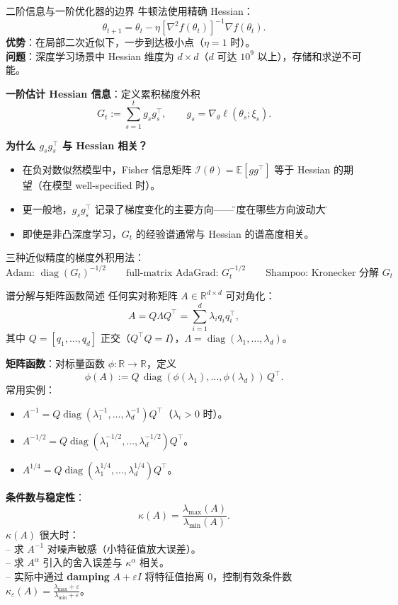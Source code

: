 \documentclass[aspectratio=169,10pt]{ctexbeamer}
\newcommand{\R}{\mathbb{R}}
\newcommand{\E}{\mathbb{E}}
\newcommand{\diag}{\operatorname{diag}}
\newcommand{\eps}{\varepsilon}
\newcommand{\grad}{\nabla}
\begin{document}
\begin{frame}{二阶信息与一阶优化器的边界}
牛顿法使用精确 Hessian：
\[
  \theta_{t+1}=\theta_t-\eta[\grad^2 f(\theta_t)]^{-1}\grad f(\theta_t).
\]
\textbf{优势}：在局部二次近似下，一步到达极小点（$\eta=1$ 时）。\\
\textbf{问题}：深度学习场景中 Hessian 维度为 $d\times d$（$d$ 可达 $10^9$ 以上），存储和求逆不可能。

\vspace{.25cm}
\textbf{一阶估计 Hessian 信息}：定义累积梯度外积
\[
  G_t:=\sum_{s=1}^t g_s g_s^\top,\qquad g_s=\grad_\theta\ell(\theta_s;\xi_s).
\]

\textbf{为什么 $g_s g_s^\top$ 与 Hessian 相关？}
\begin{itemize}
  \item 在负对数似然模型中，Fisher 信息矩阵 $\mathcal{I}(\theta)=\E[g g^\top]$ 等于 Hessian 的期望（在模型 well-specified 时）。
  \item 更一般地，$g_s g_s^\top$ 记录了梯度变化的主要方向——\"梯度在哪些方向波动大\"。
  \item 即使是非凸深度学习，$G_t$ 的经验谱通常与 Hessian 的谱高度相关。
\end{itemize}

\vspace{.25cm}
三种近似精度的梯度外积用法：
\[
  \text{Adam: }\diag(G_t)^{-1/2}\qquad
  \text{full-matrix AdaGrad: }G_t^{-1/2}\qquad
  \text{Shampoo: Kronecker 分解 }G_t
\]
\end{frame}

\begin{frame}{谱分解与矩阵函数简述}
任何实对称矩阵 $A\in\R^{d\times d}$ 可对角化：
\[
  A=Q\Lambda Q^\top=\sum_{i=1}^d\lambda_i q_i q_i^\top,
\]
其中 $Q=[q_1,\ldots,q_d]$ 正交（$Q^\top Q=I$），$\Lambda=\diag(\lambda_1,\ldots,\lambda_d)$。

\vspace{.25cm}
\textbf{矩阵函数}：对标量函数 $\phi:\R\to\R$，定义
\[
  \phi(A):=Q\,\diag(\phi(\lambda_1),\ldots,\phi(\lambda_d))\,Q^\top.
\]
常用实例：
\begin{itemize}
  \item $A^{-1}=Q\diag(\lambda_1^{-1},\ldots,\lambda_d^{-1})Q^\top$（$\lambda_i>0$ 时）。
  \item $A^{-1/2}=Q\diag(\lambda_1^{-1/2},\ldots,\lambda_d^{-1/2})Q^\top$。
  \item $A^{1/4}=Q\diag(\lambda_1^{1/4},\ldots,\lambda_d^{1/4})Q^\top$。
\end{itemize}

\vspace{.25cm}
\textbf{条件数与稳定性}：
\[
  \kappa(A)=\frac{\lambda_{\max}(A)}{\lambda_{\min}(A)}.
\]
$\kappa(A)$ 很大时：\\
-- 求 $A^{-1}$ 对噪声敏感（小特征值放大误差）。\\
-- 求 $A^{\alpha}$ 引入的舍入误差与 $\kappa^\alpha$ 相关。\\
-- 实际中通过 \textbf{damping} $A+\eps I$ 将特征值抬离 0，控制有效条件数 $\kappa_\eps(A)=\frac{\lambda_{\max}+\eps}{\lambda_{\min}+\eps}$。
\end{frame}
\end{document}
